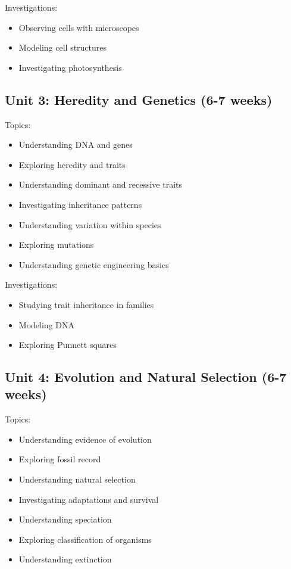 \documentclass[11pt,letterpaper]{report}
\begin{document}
Investigations:
\begin{itemize}
\item Observing cells with microscopes
\item Modeling cell structures
\item Investigating photosynthesis
\end{itemize}

\subsection{Unit 3: Heredity and Genetics (6-7 weeks)}

Topics:
\begin{itemize}
\item Understanding DNA and genes
\item Exploring heredity and traits
\item Understanding dominant and recessive traits
\item Investigating inheritance patterns
\item Understanding variation within species
\item Exploring mutations
\item Understanding genetic engineering basics
\end{itemize}

Investigations:
\begin{itemize}
\item Studying trait inheritance in families
\item Modeling DNA
\item Exploring Punnett squares
\end{itemize}

\subsection{Unit 4: Evolution and Natural Selection (6-7 weeks)}

Topics:
\begin{itemize}
\item Understanding evidence of evolution
\item Exploring fossil record
\item Understanding natural selection
\item Investigating adaptations and survival
\item Understanding speciation
\item Exploring classification of organisms
\item Understanding extinction
\end{itemize}
\end{document}
